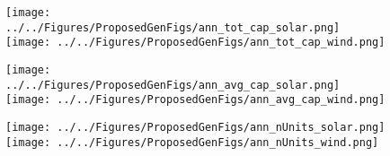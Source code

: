 \documentclass[11pt, oneside]{article}   	%
\begin{document}








\begin{figure}[ht]
\texttt{[image: ../../Figures/ProposedGenFigs/ann\_tot\_cap\_solar.png]}
\texttt{[image: ../../Figures/ProposedGenFigs/ann\_tot\_cap\_wind.png]}
\end{figure}

\begin{figure}[ht]
\texttt{[image: ../../Figures/ProposedGenFigs/ann\_avg\_cap\_solar.png]}
\texttt{[image: ../../Figures/ProposedGenFigs/ann\_avg\_cap\_wind.png]}
\end{figure}

\begin{figure}[ht]
\texttt{[image: ../../Figures/ProposedGenFigs/ann\_nUnits\_solar.png]}
\texttt{[image: ../../Figures/ProposedGenFigs/ann\_nUnits\_wind.png]}
\end{figure}
\end{document}
